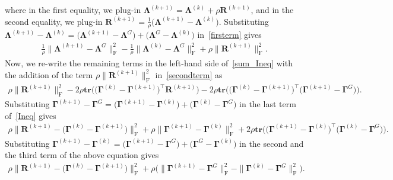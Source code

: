 \documentclass[alpha-refs]{wiley-article}
\begin{document}
where in the first equality, we plug-in $\boldsymbol{\Lambda}^{(k+1)}=\boldsymbol{\Lambda}^{(k)}+\rho \boldsymbol{R}^{(k+1)}$, and in the second equality, we plug-in $\boldsymbol{R}^{(k+1)}=\frac{1}{\rho}\big( \boldsymbol{\Lambda}^{(k+1)} - \boldsymbol{\Lambda}^{(k)} \big)$.
Substituting $\boldsymbol{\Lambda}^{(k+1)} - \boldsymbol{\Lambda}^{(k)} = \big( \boldsymbol{\Lambda}^{(k+1)} - \boldsymbol{\Lambda}^{G} \big) + \big( \boldsymbol{\Lambda}^{G} - \boldsymbol{\Lambda}^{(k)} \big)$ in~\eqref{firsterm} gives
\begin{align}
    \frac{1}{\rho} \| \boldsymbol{\Lambda}^{(k+1)} - \boldsymbol{\Lambda}^{G} \|_{\text{F}}^{2} - \frac{1}{\rho} \| \boldsymbol{\Lambda}^{(k)} - \boldsymbol{\Lambda}^{G} \|_{\text{F}}^{2} + \rho \| \boldsymbol{R}^{(k+1)} \|_{\text{F}}^{2}. \label{secondterm}
\end{align}
Now, we re-write the remaining terms in the left-hand side of~\eqref{sum_Ineq} with the addition of the term $\rho \| \boldsymbol{R}^{(k+1)} \|_{\text{F}}^{2}$ in~\eqref{secondterm} as
\begin{align} \label{Ineq}
    \rho \| \boldsymbol{R}^{(k+1)} \|_{\text{F}}^{2} -2 \rho \textbf{tr}\big( \big( \boldsymbol{\Gamma}^{(k)} - \boldsymbol{\Gamma}^{(k+1)} \big)^{\top}\boldsymbol{R}^{(k+1)} \big) 
    -2\rho \textbf{tr}\big( \big( \boldsymbol{\Gamma}^{(k)} - \boldsymbol{\Gamma}^{(k+1)} \big)^{\top}\big(\boldsymbol{\Gamma}^{(k+1)}-\boldsymbol{\Gamma}^{G}\big) \big).
\end{align}
Substituting $\boldsymbol{\Gamma}^{(k+1)} - \boldsymbol{\Gamma}^{G} = \big( \boldsymbol{\Gamma}^{(k+1)} - \boldsymbol{\Gamma}^{(k)} \big) + \big( \boldsymbol{\Gamma}^{(k)} - \boldsymbol{\Gamma}^{G} \big)$ in the last term of~\eqref{Ineq} gives 
\begin{align*} 
    \rho \| \boldsymbol{R}^{(k+1)} - \big( \boldsymbol{\Gamma}^{(k)} - \boldsymbol{\Gamma}^{(k+1)} \big) \|_{\text{F}}^{2} 
    + \rho \| \boldsymbol{\Gamma}^{(k+1)} - \boldsymbol{\Gamma}^{(k)} \|_{\text{F}}^{2} + 2 \rho \textbf{tr}\big( \big( \boldsymbol{\Gamma}^{(k+1)} - \boldsymbol{\Gamma}^{(k)} \big)^{\top}\big(\boldsymbol{\Gamma}^{(k)}-\boldsymbol{\Gamma}^{G}\big) \big).
\end{align*}
Substituting $\boldsymbol{\Gamma}^{(k+1)} - \boldsymbol{\Gamma}^{(k)} = \big( \boldsymbol{\Gamma}^{(k+1)} - \boldsymbol{\Gamma}^{G} \big) + \big( \boldsymbol{\Gamma}^{G} - \boldsymbol{\Gamma}^{(k)} \big)$ in the second and the third term of the above equation gives 
\begin{align*}
    \rho \| \boldsymbol{R}^{(k+1)} - \big( \boldsymbol{\Gamma}^{(k)} - \boldsymbol{\Gamma}^{(k+1)} \big) \|_{\text{F}}^{2} 
    + \rho \bigg( \| \boldsymbol{\Gamma}^{(k+1)} - \boldsymbol{\Gamma}^{G} \|_{\text{F}}^{2} 
    - \| \boldsymbol{\Gamma}^{(k)} - \boldsymbol{\Gamma}^{G} \|_{\text{F}}^{2} \bigg).
\end{align*}
\end{document}
